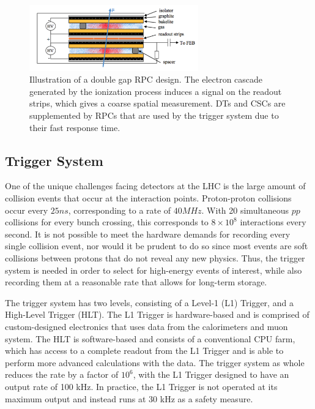 \begin{figure}[htbp]
  \centering
  \includegraphics[width=0.65\textwidth]{fig/experiment/rpc_schema.pdf}
  \caption{
    Illustration of a double gap RPC design.
    The electron cascade generated by the ionization process induces a signal on the readout strips, which gives a coarse spatial measurement.
    DTs and CSCs are supplemented by RPCs that are used by the trigger system due to their fast response time.
  }
  \label{fig:CMSRPC}
\end{figure}

\subsection{Trigger System}
\label{subsec:trigger}

One of the unique challenges facing detectors at the LHC is the large amount of collision events that occur at the interaction points.
Proton-proton collisions occur every $25\unit{ns}$, corresponding to a rate of $40\unit{MHz}$.
With 20 simultaneous $pp$ collisions for every bunch crossing, this corresponds to $8\times10^8$ interactions every second.
It is not possible to meet the hardware demands for recording every single collision event, nor would it be prudent to do so since most events are soft collisions between protons that do not reveal any new physics.
Thus, the trigger system is needed in order to select for high-energy events of interest, while also recording them at a reasonable rate that allows for long-term storage.

The trigger system has two levels, consisting of a Level-1 (L1) Trigger, and a High-Level Trigger (HLT).
The L1 Trigger is hardware-based and is comprised of custom-designed electronics that uses data from the calorimeters and muon system.
The HLT is software-based and consists of a conventional CPU farm, which has access to a complete readout from the L1 Trigger and is able to perform more advanced calculations with the data.
The trigger system as whole reduces the rate by a factor of $10^6$, with the L1 Trigger designed to have an output rate of 100 kHz.
In practice, the L1 Trigger is not operated at its maximum output and instead runs at 30 kHz as a safety measure.

